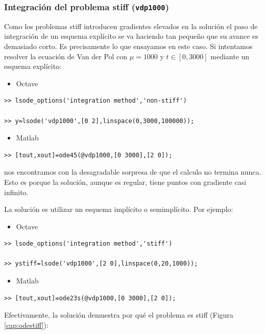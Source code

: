 \subsubsection{Integración del problema stiff (\texttt{vdp1000})}

Como los problemas stiff introducen gradientes elevados en la solución
el paso de integración de un esquema explícito se va haciendo tan
pequeño que su avance es demasiado corto. Es precisamente lo que ensayamos
en este caso. Si intentamos resolver la ecuación de Van der Pol con
$\mu=1000$ y $t\in[0,3000]$ mediante un esquema explícito:

\begin{itemize}
\item Octave
\end{itemize}
  \begin{verbatim}
>> lsode_options('integration method','non-stiff')

>> y=lsode('vdp1000',[0 2],linspace(0,3000,100000));
 \end{verbatim}
\begin{itemize}
\item Matlab
\end{itemize}
  \begin{verbatim}
>> [tout,xout]=ode45(@vdp1000,[0 3000],[2 0]); 
 \end{verbatim}
nos encontramos con la desagradable sorpresa de que el calculo no
termina nunca. Esto es porque la solución, aunque es regular, tiene
puntos con gradiente casi infinito.

La solución es utilizar un esquema implícito o semimplícito. Por ejemplo:

\begin{itemize}
\item Octave
\end{itemize}
  \begin{verbatim}
>> lsode_options('integration method','stiff')

>> ystiff=lsode('vdp1000',[2 0],linspace(0,20,1000));
 \end{verbatim}
\begin{itemize}
\item Matlab
\end{itemize}
  \begin{verbatim}
>> [tout,xout]=ode23s(@vdp1000,[0 3000],[2 0]);
 \end{verbatim}
Efectivamente, la solución demuestra por qué el problema es stiff
(Figura \ref{cap:odestiff}):

